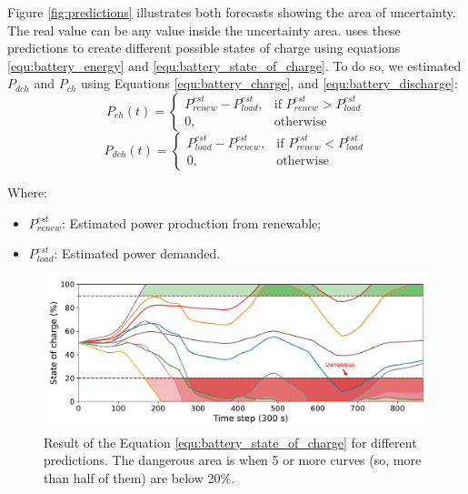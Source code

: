 Figure \ref{fig:predictions} illustrates both forecasts showing the area of uncertainty. The real value can be any value inside the uncertainty area. \emph{\systemName} uses these predictions to create different possible states of charge using equations \ref{equ:battery_energy} and \ref{equ:battery_state_of_charge}. To do so, we estimated $P_{dch}$ and $P_{ch}$ using Equations \ref{equ:battery_charge}, and \ref{equ:battery_discharge}: 
\begin{equation}
    \label{equ:battery_charge}
    P_{ch}(t) = 
    \begin{cases}
        P_{renew}^{est} - P_{load}^{est},& \text{if } P_{renew}^{est} > P_{load}^{est} \\
        0,              & \text{otherwise}
    \end{cases}
\end{equation}
\begin{equation}
    \label{equ:battery_discharge}
    P_{dch}(t) = 
    \begin{cases}
        P_{load}^{est} - P_{renew}^{est},& \text{if } P_{renew}^{est} < P_{load}^{est} \\
        0,              & \text{otherwise}
    \end{cases}
\end{equation}

Where:
\begin{itemize}
    \item \(P_{renew}^{est}\): Estimated power production from renewable;
    \item \(P_{load}^{est}\): Estimated power demanded.
\end{itemize}

\begin{figure}[!htb]
    \centering
    \includegraphics[scale=0.5]{Images/Heuristic/state_of_charge.pdf}
    \caption{Result of the Equation \ref{equ:battery_state_of_charge} for different predictions. The dangerous area is when 5 or more curves (so, more than half of them) are below 20\%.}
    \label{fig:estimated_state_of_charge}
\end{figure}

